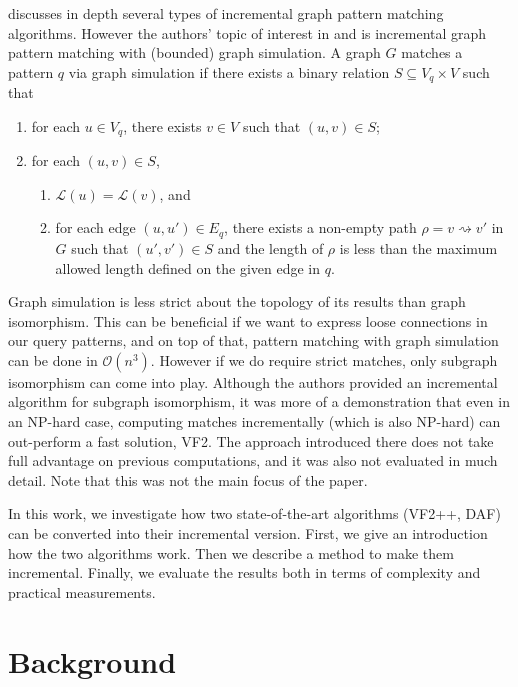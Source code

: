 \cite{incrementalpatternmatching} discusses in depth several types of incremental graph pattern matching algorithms.
However the authors' topic of interest in \cite{incrementalpatternmatching2} and \cite{incrementalpatternmatching} is incremental graph pattern matching
with (bounded) graph simulation. A graph \(G\) matches a pattern \(q\) via graph 
simulation if there exists a binary relation \(S \subseteq V_q \times V\) such that 
\begin{enumerate}
    \item for each \(u \in V_q\), there exists \(v \in V\) such that \((u, v) \in S\);
    \item for each \((u, v) \in S\), 
        \begin{enumerate}
            \item \(\mathcal{L}(u) = \mathcal{L}(v)\), and
            \item for each edge \((u, u') \in E_q\), there exists a non-empty path \(\rho = v \rightsquigarrow v'\) in \(G\) such that \((u', v') \in S\) and the length of \(\rho\) is less than the maximum allowed length defined on the given edge in \(q\).
        \end{enumerate}
\end{enumerate}
Graph simulation is less strict about the topology of its results than graph
isomorphism. This can be beneficial if we want to express loose connections in
our query patterns, and on top of that, pattern matching with graph simulation
can be done in \(\mathcal{O}(n^3)\). However if we do require strict matches,
only subgraph isomorphism can come into play. Although the authors provided an
incremental algorithm for subgraph isomorphism, it was more of a demonstration
that even in an NP-hard case, computing matches incrementally (which is also
NP-hard) can out-perform a fast solution, VF2. The approach introduced there
does not take full advantage on previous computations, and it was also not 
evaluated in much detail. Note that this was not the main focus of the paper.

In this work, we investigate how two state-of-the-art algorithms (VF2++, DAF)
can be converted into their incremental version. First, we give an introduction
how the two algorithms work. Then we describe a method to make them incremental.
Finally, we evaluate the results both in terms of complexity and practical
measurements.

\section{Background}

